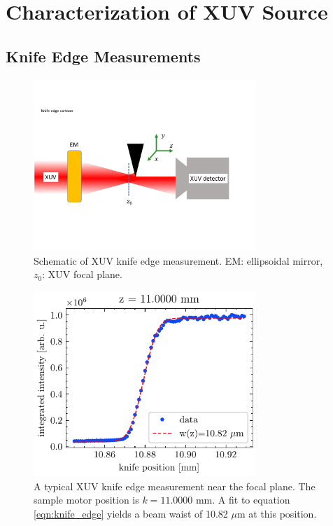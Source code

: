 \section{Characterization of XUV Source}

\subsection{Knife Edge Measurements}

\begin{figure}
	\centering
	\includegraphics[width=0.75\textwidth]{figures/chap3/knife_edge_cartoon.pdf}
	\caption{Schematic of XUV knife edge measurement. EM: ellipsoidal mirror, $z_0$: XUV focal plane.}
	\label{fig:knife_edge_cartoon}
\end{figure}

\begin{figure}
	\centering
	\includegraphics[width=0.75\textwidth]{figures/chap3/XUV_focus_knife_edge.pdf}
	\caption{A typical XUV knife edge measurement near the focal plane. The sample motor position is $k=11.0000$ mm. A fit to equation \cref{eqn:knife_edge} yields a beam waist of 10.82 $\mu$m at this position.}
	\label{fig:XUV_focus_knife_edge}
\end{figure}

